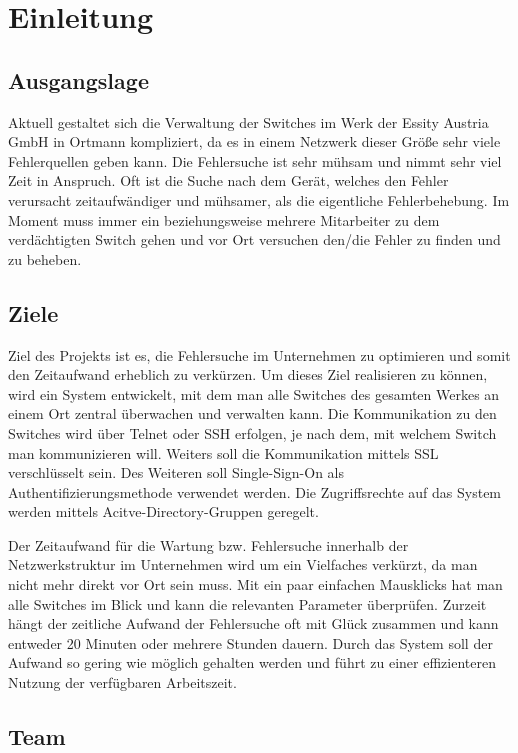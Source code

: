 \chapter{Einleitung}


\section{Ausgangslage}
Aktuell gestaltet sich die Verwaltung der Switches im Werk der Essity Austria GmbH in Ortmann kompliziert, da es in einem Netzwerk dieser Größe sehr viele Fehlerquellen geben kann. Die Fehlersuche ist sehr mühsam und nimmt sehr viel Zeit in Anspruch. Oft ist die Suche nach dem Gerät, welches den Fehler verursacht zeitaufwändiger und mühsamer, als die eigentliche Fehlerbehebung. Im Moment muss immer ein beziehungsweise mehrere Mitarbeiter zu dem verdächtigten Switch gehen und vor Ort versuchen den/die Fehler zu finden und zu beheben.

\section{Ziele}
Ziel des Projekts ist es, die Fehlersuche im Unternehmen zu optimieren und somit den Zeitaufwand erheblich zu verkürzen. Um dieses Ziel realisieren zu können, wird ein System entwickelt, mit dem man alle Switches des gesamten Werkes an einem Ort zentral überwachen und verwalten kann. Die Kommunikation zu den Switches wird über Telnet oder SSH erfolgen, je nach dem, mit welchem Switch man kommunizieren will. Weiters soll die Kommunikation mittels SSL verschlüsselt sein. Des Weiteren soll Single-Sign-On als Authentifizierungsmethode verwendet werden. Die Zugriffsrechte auf das System werden mittels Acitve-Directory-Gruppen geregelt. 
\newline

Der Zeitaufwand für die Wartung bzw. Fehlersuche innerhalb der Netzwerkstruktur im Unternehmen wird um ein Vielfaches verkürzt, da man nicht mehr direkt vor Ort sein muss. Mit ein paar einfachen Mausklicks hat man alle Switches im Blick und kann die relevanten Parameter überprüfen. Zurzeit hängt der zeitliche Aufwand der Fehlersuche oft mit Glück zusammen und kann entweder 20 Minuten oder mehrere Stunden dauern. Durch das System soll der Aufwand so gering wie möglich gehalten werden und führt zu einer effizienteren Nutzung der verfügbaren Arbeitszeit.

\newpage
\section{Team}

